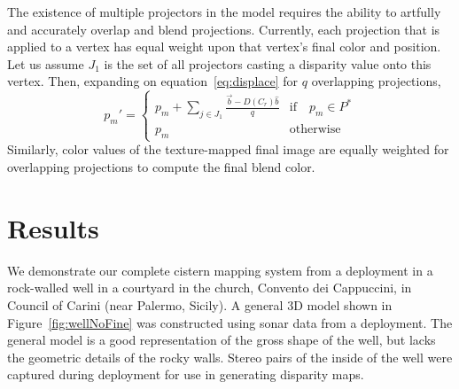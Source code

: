 \documentclass{llncs}
\begin{document}
The existence of multiple projectors in the model requires the ability to artfully and accurately overlap and blend projections. 
Currently, each projection that is applied to a vertex has equal weight upon that vertex's final color and position. Let us assume $J_1$ is the set of all projectors casting a disparity value onto this vertex. Then, expanding on equation~\ref{eq:displace} for $q$ overlapping projections,
\begin{equation}
p_{m}' = \left \{ 
\begin{array}{ll}
p_{m} + \sum\limits_{j \in J_1} \frac{\vec{b} - D(C_r)\hat{b}}{q} & \text{if} \quad p_{m} \in P^{*}\\
p_{m} & \text{otherwise}
\end{array}\right.
\label{eq:displaceBlend}
\end{equation}
Similarly, color values of the texture-mapped final image are equally weighted for overlapping projections to compute the final blend color.



\section{Results}
\label{sec:results}

\noindent We demonstrate our complete cistern mapping system from a deployment in a rock-walled well in a courtyard in the church, Convento dei Cappuccini, in Council of Carini (near Palermo, Sicily).
A general 3D model shown in Figure~\ref{fig:wellNoFine} was constructed using sonar data from a deployment. The general model is a good representation of the gross shape of the well, but lacks the geometric details of the rocky walls.
Stereo pairs of the inside of the well were captured during deployment for use in generating disparity maps.
\end{document}
